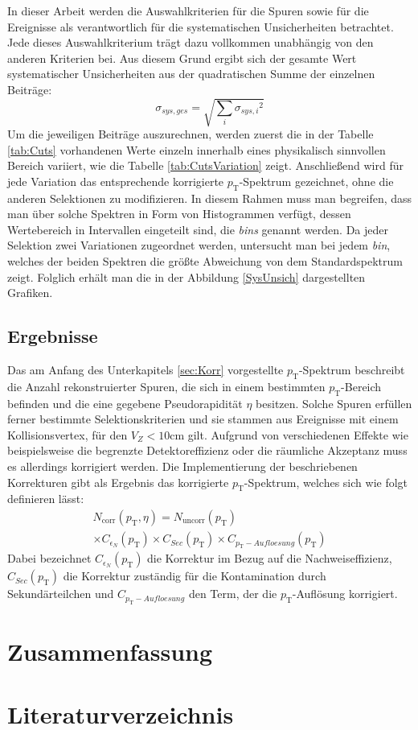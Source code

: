 \documentclass[12pt,a4paper]{report}
\begin{document}
In dieser Arbeit werden die Auswahlkriterien für die Spuren sowie für die Ereignisse als verantwortlich für die systematischen Unsicherheiten betrachtet. Jede dieses Auswahlkriterium trägt dazu vollkommen unabhängig von den anderen Kriterien bei. Aus diesem Grund ergibt sich der gesamte Wert systematischer Unsicherheiten aus der quadratischen Summe der einzelnen Beiträge:
\begin{equation}
\sigma_{sys, ges} = \sqrt{\sum_{i}{\sigma_{sys, i}}^2}
\end{equation}
Um die jeweiligen Beiträge auszurechnen, werden zuerst die in der Tabelle \ref{tab:Cuts} vorhandenen Werte einzeln innerhalb eines physikalisch sinnvollen Bereich variiert, wie die Tabelle \ref{tab:CutsVariation} zeigt. Anschließend wird für jede Variation das entsprechende korrigierte $p_{\mathrm{T}}$-Spektrum gezeichnet, ohne die anderen Selektionen zu modifizieren. In diesem Rahmen muss man begreifen, dass man über solche Spektren in Form von Histogrammen verfügt, dessen Wertebereich in Intervallen eingeteilt sind, die \textit{bins} genannt werden. Da jeder Selektion zwei Variationen zugeordnet werden, untersucht man bei jedem \textit{bin}, welches der beiden Spektren die größte Abweichung von dem Standardspektrum zeigt. Folglich erhält man die in der Abbildung \ref{SysUnsich} dargestellten Grafiken.	



\section{Ergebnisse}
Das am Anfang des Unterkapitels \ref{sec:Korr} vorgestellte $p_{\mathrm{T}}$-Spektrum beschreibt die Anzahl rekonstruierter Spuren, die sich in einem bestimmten $p_{\mathrm{T}}$-Bereich befinden und die eine gegebene Pseudorapidität $\eta$ besitzen. Solche Spuren erfüllen ferner bestimmte Selektionskriterien und sie stammen aus Ereignisse mit einem Kollisionsvertex, für den $V_{Z} < 10\mathrm{cm}$ gilt. Aufgrund von verschiedenen Effekte wie beispielsweise die begrenzte Detektoreffizienz oder die räumliche Akzeptanz muss es allerdings korrigiert werden. Die Implementierung der beschriebenen Korrekturen gibt als Ergebnis das korrigierte $p_{\mathrm{T}}$-Spektrum, welches sich wie folgt definieren lässt:
\begin{equation}
\begin{split}
N_\mathrm{corr}(p_{\mathrm{T}}, \eta) = N_{\mathrm{uncorr}}(p_{\mathrm{T}}) \\
\times C_{\epsilon_{N}}(p_{\mathrm{T}})  \times C_{Sec}(p_{\mathrm{T}}) \times C_{p_{\mathrm{T}}-Aufloesung}(p_{\mathrm{T}})
\end{split} 
\end{equation}
Dabei bezeichnet $C_{\epsilon_{N}}(p_{\mathrm{T}})$ die Korrektur im Bezug auf die Nachweiseffizienz, $C_{Sec}(p_{\mathrm{T}})$ die Korrektur zuständig für die Kontamination durch Sekundärteilchen und $C_{p_{\mathrm{T}}-Aufloesung}$ den Term, der die $p_{\mathrm{T}}$-Auflösung korrigiert.

\chapter{Zusammenfassung}
\chapter{Literaturverzeichnis}
\end{document}
